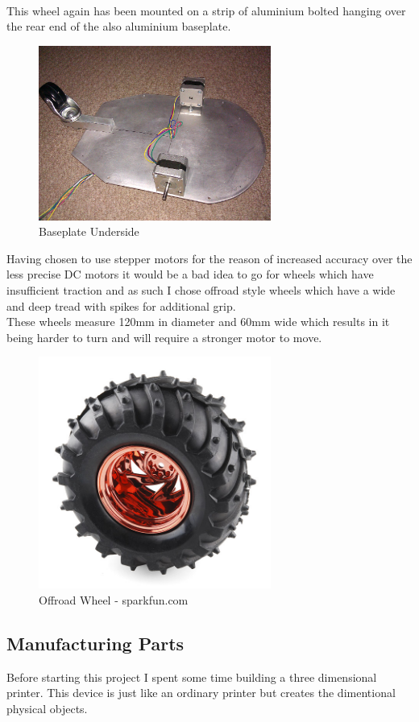 \\This wheel again has been mounted on a strip of aluminium bolted hanging over the rear end of the also aluminium baseplate.
\begin{figure}[h]
\centering
        \includegraphics[width=3.0in]  {Images/baseplate-underside.jpg}
        \caption{Baseplate Underside}
        \label{Baseplate Underside}
\end{figure}
Having chosen to use stepper motors for the reason of increased accuracy over the less precise DC motors it would be a bad idea to go for wheels which have insufficient traction and as such I chose offroad style wheels which have a wide and deep tread with spikes for additional grip.
\\These wheels measure 120mm in diameter and 60mm wide which results in it being harder to turn and will require a stronger motor to move.
\begin{figure}[h]
\centering
        \includegraphics[width=3.0in]  {Images/wheel-offroad.jpg}
        \caption{Offroad Wheel - sparkfun.com}
        \label{Offroad Wheel}
\end{figure}
\subsection{Manufacturing Parts}
Before starting this project I spent some time building a three dimensional printer.  This device is just like an ordinary printer but creates the dimentional physical objects.


